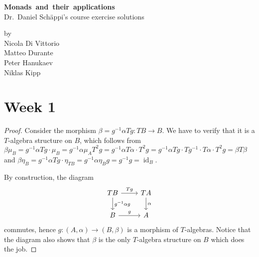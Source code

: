 \documentclass[a4paper,11pt,oneside,openany]{scrbook}
\DeclareMathOperator{\id}{id}
\theoremstyle{definition}
\theoremstyle{definition}
\begin{document}
	\begin{titlepage}
		\begin{center}
			\Huge \textbf{Monads~and~their~applications}\\
			\vspace{1cm}
			\Large Dr.\ Daniel Schäppi's course exercise solutions\\
		\end{center}

		\vspace{1cm}

			\begin{center}
			\Large	by\\
				\vspace{.2cm}
			\Large	Nicola Di Vittorio\\
			\Large	Matteo Durante\\
			\Large  Peter Hanukaev\\
			\Large  Niklas Kipp
        \end{center}

	\end{titlepage}


\frontmatter
	\thispagestyle{empty}\doclicenseThis
	\tableofcontents
	
	\mainmatter

\chapter{Week 1}

\begin{proof}
    Consider the morphism $\beta=g^{-1}\alpha Tg\colon TB\rightarrow B$. We have
    to verify that it is a $T$-algebra structure on $B$, which follows from
    $\beta\mu_B=g^{-1}\alpha Tg\cdot\mu_B=g^{-1}\alpha\mu_A T^2g=g^{-1}\alpha
    T\alpha\cdot
    T^2g=g^{-1}\alpha Tg\cdot Tg^{-1}\cdot T\alpha\cdot T^2g=\beta T\beta$ and
    $\beta\eta_B=g^{-1}\alpha Tg\cdot\eta_{TB}=g^{-1}\alpha\eta_B
    g=g^{-1}g=\id_B$.
    
    By
    construction, the diagram
    \[
    \begin{tikzcd}
        TB\ar[r, "Tg"]\ar[d, "g^{-1}\alpha g"]
        & TA\ar[d, "\alpha"] \\
        B\ar[r, "g"]
        & A
    \end{tikzcd}
    \] 
    commutes, hence $g\colon (A,\alpha)\rightarrow (B,\beta)$ is a morphism of
    $T$-algebras. Notice that the diagram also shows that $\beta$ is the only
    $T$-algebra structure on $B$ which does the job.
\end{proof}
\end{document}
